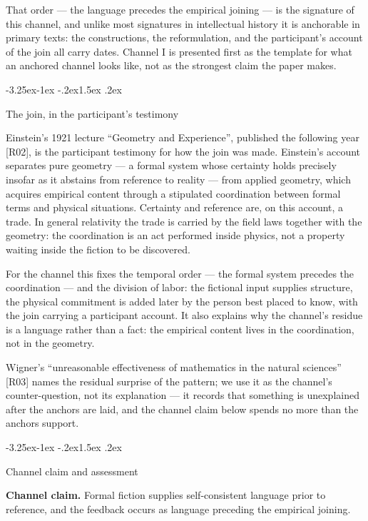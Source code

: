\documentclass[11pt,a4paper]{article}
\makeatletter
\renewcommand\subsection{\@startsection{subsection}{2}{\z@}%
  {-3.25ex\@plus -1ex \@minus -.2ex}{1.5ex \@plus .2ex}%
  {\normalfont\large\bfseries\raggedright}}
\makeatother
\begin{document}
That order — the language precedes the empirical joining — is the signature of this channel, and unlike most signatures in intellectual history it is anchorable in primary texts: the constructions, the reformulation, and the participant's account of the join all carry dates. Channel I is presented first as the template for what an anchored channel looks like, not as the strongest claim the paper makes.

\subsection{The join, in the participant's testimony}

Einstein's 1921 lecture ``Geometry and Experience'', published the following year [R02], is the participant testimony for how the join was made. Einstein's account separates pure geometry — a formal system whose certainty holds precisely insofar as it abstains from reference to reality — from applied geometry, which acquires empirical content through a stipulated coordination between formal terms and physical situations. Certainty and reference are, on this account, a trade. In general relativity the trade is carried by the field laws together with the geometry: the coordination is an act performed inside physics, not a property waiting inside the fiction to be discovered.

For the channel this fixes the temporal order — the formal system precedes the coordination — and the division of labor: the fictional input supplies structure, the physical commitment is added later by the person best placed to know, with the join carrying a participant account. It also explains why the channel's residue is a language rather than a fact: the empirical content lives in the coordination, not in the geometry.

Wigner's ``unreasonable effectiveness of mathematics in the natural sciences'' [R03] names the residual surprise of the pattern; we use it as the channel's counter-question, not its explanation — it records that something is unexplained after the anchors are laid, and the channel claim below spends no more than the anchors support.

\subsection{Channel claim and assessment}

\textbf{Channel claim.} Formal fiction supplies self-consistent language prior to reference, and the feedback occurs as language preceding the empirical joining.
\end{document}
